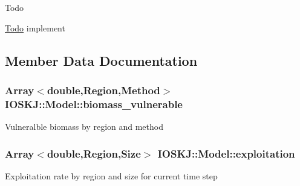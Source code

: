 \begin{DoxyRefDesc}{Todo}
\item[\hyperlink{todo__todo000003}{Todo}]implement \end{DoxyRefDesc}


\subsection{Member Data Documentation}
\hypertarget{classIOSKJ_1_1Model_a0aa015def5316af0f5ce23bdaecbf67c}{
\subsubsection[{biomass\-\_\-vulnerable}]{\setlength{\rightskip}{0pt plus 5cm}Array$<$double,Region,Method$>$ I\-O\-S\-K\-J\-::\-Model\-::biomass\-\_\-vulnerable}}\label{classIOSKJ_1_1Model_a0aa015def5316af0f5ce23bdaecbf67c}
Vulneralble biomass by region and method \hypertarget{classIOSKJ_1_1Model_ad4379e82be5723f2e1b58e9492dde3dc}{
\subsubsection[{exploitation}]{\setlength{\rightskip}{0pt plus 5cm}Array$<$double,Region,Size$>$ I\-O\-S\-K\-J\-::\-Model\-::exploitation}}\label{classIOSKJ_1_1Model_ad4379e82be5723f2e1b58e9492dde3dc}
Exploitation rate by region and size for current time step

